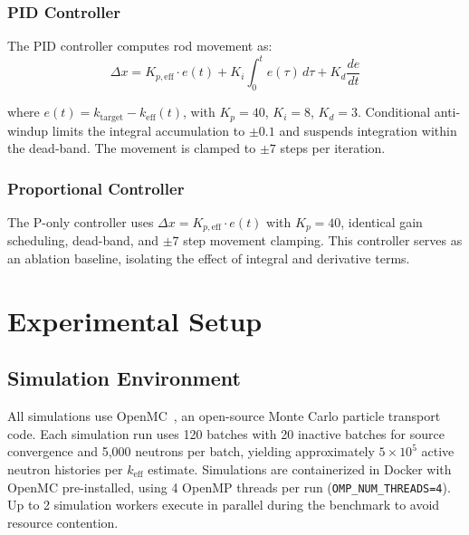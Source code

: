 \documentclass[11pt,twocolumn]{article}
\begin{document}
\subsubsection{PID Controller}

The PID controller computes rod movement as:
\begin{equation}
    \Delta x = K_{p,\text{eff}} \cdot e(t) + K_i \int_0^t e(\tau)\,d\tau + K_d \frac{de}{dt}
\end{equation}

\noindent where $e(t) = k_\text{target} - k_\text{eff}(t)$, with $K_p = 40$, $K_i = 8$, $K_d = 3$.
Conditional anti-windup limits the integral accumulation to $\pm 0.1$ and suspends integration within the dead-band.
The movement is clamped to $\pm 7$ steps per iteration.

\subsubsection{Proportional Controller}

The P-only controller uses $\Delta x = K_{p,\text{eff}} \cdot e(t)$ with $K_p = 40$, identical gain scheduling, dead-band, and $\pm 7$ step movement clamping.
This controller serves as an ablation baseline, isolating the effect of integral and derivative terms.

\section{Experimental Setup}
\label{sec:experimental}

\subsection{Simulation Environment}

All simulations use OpenMC~\cite{romano2015openmc}, an open-source Monte Carlo particle transport code.
Each simulation run uses 120 batches with 20 inactive batches for source convergence and 5{,}000 neutrons per batch, yielding approximately $5 \times 10^5$ active neutron histories per $k_\text{eff}$ estimate.
Simulations are containerized in Docker with OpenMC pre-installed, using 4 OpenMP threads per run (\texttt{OMP\_NUM\_THREADS=4}).
Up to 2 simulation workers execute in parallel during the benchmark to avoid resource contention.
\end{document}
